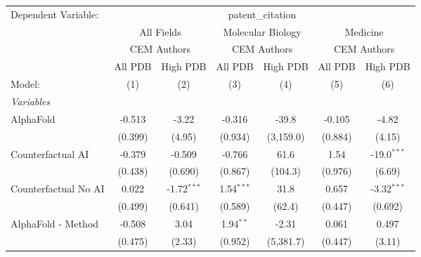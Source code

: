 \begingroup
\centering
\begin{tabular}{lcccccc}
   \tabularnewline \midrule \midrule
   Dependent Variable: & \multicolumn{6}{c}{patent\_citation}\\
 & \multicolumn{2}{c}{All Fields} & \multicolumn{2}{c}{Molecular Biology} & \multicolumn{2}{c}{Medicine} \\
\cmidrule(lr){2-3} \cmidrule(lr){4-5} \cmidrule(lr){6-7}
 & \multicolumn{2}{c}{CEM Authors} & \multicolumn{2}{c}{CEM Authors} & \multicolumn{2}{c}{CEM Authors} \\
\cmidrule(lr){2-3} \cmidrule(lr){4-5} \cmidrule(lr){6-7}
 & \multicolumn{1}{c}{All PDB} & \multicolumn{1}{c}{High PDB} & \multicolumn{1}{c}{All PDB} & \multicolumn{1}{c}{High PDB} & \multicolumn{1}{c}{All PDB} & \multicolumn{1}{c}{High PDB} \\
\cmidrule(lr){2-2} \cmidrule(lr){3-3} \cmidrule(lr){4-4} \cmidrule(lr){5-5} \cmidrule(lr){6-6} \cmidrule(lr){7-7}
   Model:                                                     & (1)           & (2)           & (3)           & (4)       & (5)          & (6)\\  
   \midrule
   \emph{Variables}\\
   AlphaFold                                                  & -0.513        & -3.22         & -0.316        & -39.8     & -0.105       & -4.82\\   
                                                              & (0.399)       & (4.95)        & (0.934)       & (3,159.0) & (0.884)      & (4.15)\\   
   Counterfactual AI                                          & -0.379        & -0.509        & -0.766        & 61.6      & 1.54         & -19.0$^{***}$\\   
                                                              & (0.438)       & (0.690)       & (0.867)       & (104.3)   & (0.976)      & (6.69)\\   
   Counterfactual No AI                                       & 0.022         & -1.72$^{***}$ & 1.54$^{***}$  & 31.8      & 0.657        & -3.32$^{***}$\\   
                                                              & (0.499)       & (0.641)       & (0.589)       & (62.4)    & (0.447)      & (0.692)\\   
   AlphaFold - Method                                         & -0.508        & 3.04          & 1.94$^{**}$   & -2.31     & 0.061        & 0.497\\   
                                                              & (0.475)       & (2.33)        & (0.952)       & (5,381.7) & (0.447)      & (3.11)\\   

\end{tabular}
